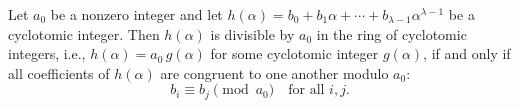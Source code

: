 Let $a_0$ be a nonzero integer and let $h(\alpha) = b_0 + b_1\alpha + \cdots + b_{\lambda-1}\alpha^{\lambda-1}$ be a cyclotomic integer. Then $h(\alpha)$ is divisible by $a_0$ in the ring of cyclotomic integers, i.e., $h(\alpha) = a_0 \, g(\alpha)$ for some cyclotomic integer $g(\alpha)$, if and only if all coefficients of $h(\alpha)$ are congruent to one another modulo $a_0$:
$$b_i \equiv b_j \pmod{a_0} \quad \text{for all } i, j.$$
